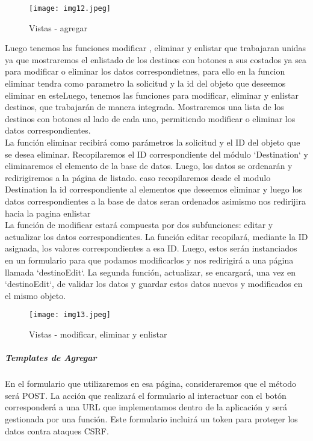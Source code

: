 \documentclass[10pt, a4paper]{article}
\begin{document}
	\begin{figure}[h]
		\centering
		\texttt{[image: img12.jpeg]}
		\caption{Vistas - agregar}
	\end{figure}
	\begin{flushleft}
		Luego tenemos las funciones modificar , eliminar y enlistar que trabajaran unidas ya que mostraremos el enlistado de los destinos con botones a sus costados ya sea para modificar o eliminar los datos correspondietnes, para ello en la funcion eliminar tendra como parametro la solicitud y la id del objeto que deseemos eliminar en esteLuego, tenemos las funciones para modificar, eliminar y enlistar destinos, que trabajarán de manera integrada. Mostraremos una lista de los destinos con botones al lado de cada uno, permitiendo modificar o eliminar los datos correspondientes. \\
		La función eliminar recibirá como parámetros la solicitud y el ID del objeto que se desea eliminar. Recopilaremos el ID correspondiente del módulo `Destination` y eliminaremos el elemento de la base de datos. Luego, los datos se ordenarán y redirigiremos a la página de listado. caso recopilaremos desde el modulo Destination la id correspondiente al elementos que deseemos eliminar y luego los datos correspondientes a la base de datos seran ordenados asimismo nos redirijira hacia la pagina enlistar\\
		La función de modificar estará compuesta por dos subfunciones: editar y actualizar los datos correspondientes. La función editar recopilará, mediante la ID asignada, los valores correspondientes a esa ID. Luego, estos serán instanciados en un formulario para que podamos modificarlos y nos redirigirá a una página llamada `destinoEdit`. La segunda función, actualizar, se encargará, una vez en `destinoEdit`, de validar los datos y guardar estos datos nuevos y modificados en el mismo objeto.
	\end{flushleft}
	\begin{figure}[h]
		\centering
		\texttt{[image: img13.jpeg]}
		\caption{Vistas - modificar, eliminar y enlistar}
	\end{figure}
	\vspace*{3cm}
	\subparagraph*{Templates de Agregar}
	\begin{flushleft}
		En el formulario que utilizaremos en esa página, consideraremos que el método será POST. La acción que realizará el formulario al interactuar con el botón corresponderá a una URL que implementamos dentro de la aplicación y será gestionada por una función. Este formulario incluirá un token para proteger los datos contra ataques CSRF.
	\end{flushleft}
\end{document}
